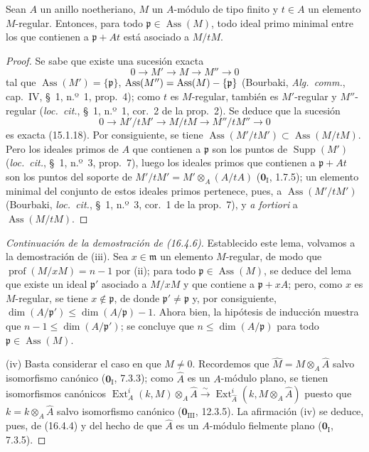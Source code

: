\begin{lemma}[16.4.6.3]
\label{0.16.4.6.3-fr}
Sean $A$ un anillo noetheriano, $M$ un $A$-módulo de tipo finito y $t\in A$ un
elemento $M$-regular. Entonces, para todo
$\mathfrak{p}\in\operatorname{Ass}(M)$, todo ideal primo minimal entre los que
contienen a $\mathfrak{p}+At$ está asociado a $M/tM$.
\end{lemma}

\begin{proof}
Se sabe que existe una sucesión exacta
\[
  0\to M'\to M\to M''\to0
\]
tal que $\operatorname{Ass}(M')=\{\mathfrak{p}\}$,
$\operatorname{Ass}(M'')=\operatorname{Ass}(M)-\{\mathfrak{p}\}$ (Bourbaki,
\emph{Alg.~comm.}, cap.~IV, \S~1, n.º~1, prop.~4); como $t$ es
$M$-regular, también es $M'$-regular y $M''$-regular
(\emph{loc.~cit.}, \S~1, n.º~1, cor.~2 de la prop.~2). Se deduce que la
sucesión
\[
  0\to M'/tM'\to M/tM\to M''/tM''\to0
\]
es exacta (15.1.18). Por consiguiente, se tiene
$\operatorname{Ass}(M'/tM')\subset\operatorname{Ass}(M/tM)$. Pero los ideales
primos de $A$ que contienen a $\mathfrak{p}$ son los puntos de
$\operatorname{Supp}(M')$ (\emph{loc.~cit.}, \S~1, n.º~3, prop.~7), luego los
ideales primos que contienen a $\mathfrak{p}+At$ son los puntos del soporte de
$M'/tM'=M'\otimes_A(A/tA)$ ($\mathbf{0}_{\mathrm I}$, 1.7.5); un elemento minimal del
conjunto de estos ideales primos pertenece, pues, a
$\operatorname{Ass}(M'/tM')$ (Bourbaki, \emph{loc.~cit.}, \S~1, n.º~3,
cor.~1 de la prop.~7), y \emph{a fortiori} a
$\operatorname{Ass}(M/tM)$.
\end{proof}

\begin{proof}[Continuación de la demostración de (16.4.6)]
Establecido este lema, volvamos a la demostración de (iii). Sea
$x\in\mathfrak{m}$ un elemento $M$-regular, de modo que
$\operatorname{prof}(M/xM)=n-1$ por (ii); para todo
$\mathfrak{p}\in\operatorname{Ass}(M)$, se deduce del lema que existe un ideal
$\mathfrak{p}'$ asociado a $M/xM$ y que contiene a $\mathfrak{p}+xA$; pero,
como $x$ es $M$-regular, se tiene $x\notin\mathfrak{p}$, de donde
$\mathfrak{p}'\neq\mathfrak{p}$ y, por consiguiente,
$\dim(A/\mathfrak{p}')\leq\dim(A/\mathfrak{p})-1$. Ahora bien, la hipótesis de
inducción muestra que $n-1\leq\dim(A/\mathfrak{p}')$; se concluye que
$n\leq\dim(A/\mathfrak{p})$ para todo
$\mathfrak{p}\in\operatorname{Ass}(M)$.

(iv) Basta considerar el caso en que $M\neq0$. Recordemos que
$\widehat{M}=M\otimes_A\widehat{A}$ salvo isomorfismo canónico
($\mathbf{0}_{\mathrm I}$, 7.3.3); como $\widehat{A}$ es un $A$-módulo plano, se tienen
isomorfismos canónicos
$\operatorname{Ext}^i_A(k,M)\otimes_A\widehat{A}\xrightarrow{\sim}\operatorname{Ext}^i_{\widehat{A}}(k,M\otimes_A\widehat{A})$
puesto que $k=k\otimes_A\widehat{A}$ salvo isomorfismo canónico
($\mathbf{0}_{\mathrm{III}}$, 12.3.5). La afirmación (iv) se deduce, pues, de (16.4.4) y
del hecho de que $\widehat{A}$ es un $A$-módulo fielmente plano
($\mathbf{0}_{\mathrm I}$, 7.3.5).
\end{proof}

